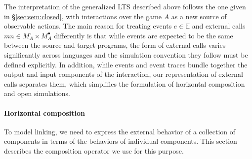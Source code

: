 \documentclass[acmsmall,authordraft]{acmart}
\newcommand{\kw}[1]{\ensuremath{ \mathsf{#1} }}
\newcommand{\bind}{\gg\!\!=}
\newcommand{\que}{\circ}
\newcommand{\ans}{\bullet}
\begin{document}
The interpretation of the generalized LTS described above
follows the one given in \S\ref{sec:sem:closed},
with interactions over the game $A$
as a new source of observable actions.
The main reason for treating
events $e \in \mathbb{E}$ and
external calls $m n \in M_A^\que \times M_A^\ans$
differently is that
while events are expected to be the same
between the source and target programs,
the form of external calls varies significantly
across languages
and the simulation convention they follow
must be defined explicitly.
In addition,
while events and event traces
bundle together the output and input
components of the interaction,
our representation of external calls
separates them,
which simplifies the formulation of
horizontal composition and open simulations.



\paragraph{Horizontal composition} %

To model linking,
we need to express the external behavior
of a collection of components
in terms of the behaviors of
individual components.
This section describes the
composition operator we use for this purpose.
\end{document}
